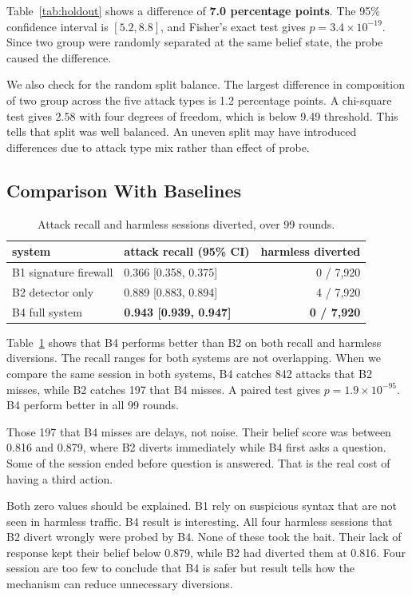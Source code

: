 \documentclass[runningheads]{llncs}
\begin{document}
Table~\ref{tab:holdout} shows a difference of \textbf{7.0 percentage points}. The 95\% confidence interval is $[5.2, 8.8]$, and Fisher's exact test gives $p = 3.4 \times 10^{-19}$. Since two group were randomly separated at the same belief state, the probe caused the difference.

We also check for the random split balance. The largest difference in composition of two group across the five attack types is 1.2 percentage points. A chi-square test gives 2.58 with four degrees of freedom, which is below 9.49 threshold. This tells that split was well balanced. An uneven split may have introduced differences due to attack type mix rather than effect of probe. 

\subsection{Comparison With Baselines}
\begin{table}[t]
\centering
\caption{Attack recall and harmless sessions diverted, over 99 rounds.}
\label{tab:baselines}
\begin{tabular}{@{}llr@{}}
\toprule
system & attack recall (95\% CI) & harmless diverted \\
\midrule
B1 signature firewall & 0.366 [0.358, 0.375] & 0 / 7{,}920 \\
B2 detector only      & 0.889 [0.883, 0.894] & 4 / 7{,}920 \\
B4 full system        & \textbf{0.943 [0.939, 0.947]} & \textbf{0 / 7{,}920} \\
\bottomrule
\end{tabular}
\end{table}

Table~\ref{tab:baselines} shows that B4 performs better than B2 on both recall and harmless diversions. The recall ranges for both systems are not overlapping. When we compare the same session in both systems, B4 catches 842 attacks that B2 misses, while B2 catches 197 that B4 misses. A paired test gives $p = 1.9 \times 10^{-95}$. B4 perform better in all 99 rounds.

Those 197 that B4 misses are delays, not noise. Their belief score was between 0.816 and 0.879, where B2 diverts immediately while B4 first asks a question. Some of the session ended before question is answered. That is the real cost of having a third action.

Both zero values should be explained. B1 rely on suspicious syntax that are not seen in harmless traffic. B4 result is interesting. All four harmless sessions that B2 divert wrongly were probed by B4. None of these took the bait. Their lack of response kept their belief below 0.879, while B2 had diverted them at 0.816. Four session are too few to conclude that B4 is safer but result tells how the mechanism can reduce unnecessary diversions.
\end{document}
